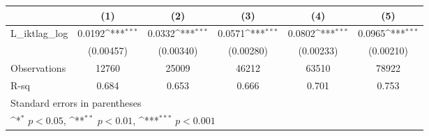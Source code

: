 {
\def\sym#1{\ifmmode^{#1}\else\(^{#1}\)\fi}
\begin{tabular}{l*{5}{c}}
\hline\hline
                &\multicolumn{1}{c}{(1)}         &\multicolumn{1}{c}{(2)}         &\multicolumn{1}{c}{(3)}         &\multicolumn{1}{c}{(4)}         &\multicolumn{1}{c}{(5)}         \\
\hline
L\_iktlag\_log    &   0.0192\sym{***}&   0.0332\sym{***}&   0.0571\sym{***}&   0.0802\sym{***}&   0.0965\sym{***}\\
                &(0.00457)         &(0.00340)         &(0.00280)         &(0.00233)         &(0.00210)         \\
\hline
Observations    &    12760         &    25009         &    46212         &    63510         &    78922         \\
R-sq            &    0.684         &    0.653         &    0.666         &    0.701         &    0.753         \\
\hline\hline
\multicolumn{6}{l}{\footnotesize Standard errors in parentheses}\\
\multicolumn{6}{l}{\footnotesize \sym{*} \(p<0.05\), \sym{**} \(p<0.01\), \sym{***} \(p<0.001\)}\\
\end{tabular}
}
